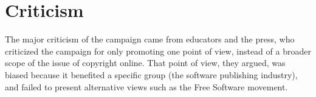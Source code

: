 
\chapter{Criticism}
\label{Criticism}

The major criticism of the campaign came from educators and the press, who criticized the campaign for only promoting one point of view, instead of a broader scope of the issue of copyright online. That point of view, they argued, was biased because it benefited a specific group (the software publishing industry), and failed to present alternative views such as the Free Software movement. \cite{piracy}